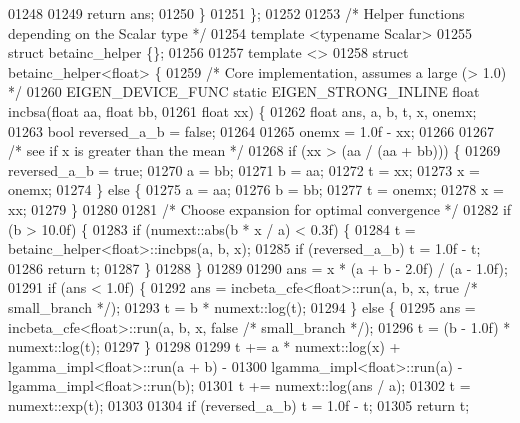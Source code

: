 \begin{DoxyCode}
01248 
01249     \textcolor{keywordflow}{return} ans;
01250   \}
01251 \};
01252 
01253 \textcolor{comment}{/* Helper functions depending on the Scalar type */}
01254 \textcolor{keyword}{template} <\textcolor{keyword}{typename} Scalar>
01255 \textcolor{keyword}{struct }betainc\_helper \{\};
01256 
01257 \textcolor{keyword}{template} <>
01258 \textcolor{keyword}{struct }betainc\_helper<float> \{
01259   \textcolor{comment}{/* Core implementation, assumes a large (> 1.0) */}
01260   EIGEN\_DEVICE\_FUNC \textcolor{keyword}{static} EIGEN\_STRONG\_INLINE \textcolor{keywordtype}{float} incbsa(\textcolor{keywordtype}{float} aa, \textcolor{keywordtype}{float} bb,
01261                                                             \textcolor{keywordtype}{float} xx) \{
01262     \textcolor{keywordtype}{float} ans, a, b, t, x, onemx;
01263     \textcolor{keywordtype}{bool} reversed\_a\_b = \textcolor{keyword}{false};
01264 
01265     onemx = 1.0f - xx;
01266 
01267     \textcolor{comment}{/* see if x is greater than the mean */}
01268     \textcolor{keywordflow}{if} (xx > (aa / (aa + bb))) \{
01269       reversed\_a\_b = \textcolor{keyword}{true};
01270       a = bb;
01271       b = aa;
01272       t = xx;
01273       x = onemx;
01274     \} \textcolor{keywordflow}{else} \{
01275       a = aa;
01276       b = bb;
01277       t = onemx;
01278       x = xx;
01279     \}
01280 
01281     \textcolor{comment}{/* Choose expansion for optimal convergence */}
01282     \textcolor{keywordflow}{if} (b > 10.0f) \{
01283       \textcolor{keywordflow}{if} (numext::abs(b * x / a) < 0.3f) \{
01284         t = betainc\_helper<float>::incbps(a, b, x);
01285         \textcolor{keywordflow}{if} (reversed\_a\_b) t = 1.0f - t;
01286         \textcolor{keywordflow}{return} t;
01287       \}
01288     \}
01289 
01290     ans = x * (a + b - 2.0f) / (a - 1.0f);
01291     \textcolor{keywordflow}{if} (ans < 1.0f) \{
01292       ans = incbeta\_cfe<float>::run(a, b, x, \textcolor{keyword}{true} \textcolor{comment}{/* small\_branch */});
01293       t = b * numext::log(t);
01294     \} \textcolor{keywordflow}{else} \{
01295       ans = incbeta\_cfe<float>::run(a, b, x, \textcolor{keyword}{false} \textcolor{comment}{/* small\_branch */});
01296       t = (b - 1.0f) * numext::log(t);
01297     \}
01298 
01299     t += a * numext::log(x) + lgamma\_impl<float>::run(a + b) -
01300          lgamma\_impl<float>::run(a) - lgamma\_impl<float>::run(b);
01301     t += numext::log(ans / a);
01302     t = numext::exp(t);
01303 
01304     \textcolor{keywordflow}{if} (reversed\_a\_b) t = 1.0f - t;
01305     \textcolor{keywordflow}{return} t;

\end{DoxyCode}
